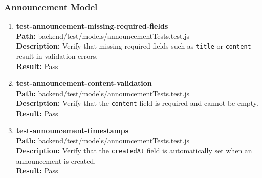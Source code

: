 \documentclass[12pt, titlepage]{article}
\begin{document}
\subsubsection{Announcement Model}
\begin{enumerate}
        \item{\textbf{test-announcement-missing-required-fields}\\}
        \textbf{Path:} backend/test/models/announcementTests.test.js\\
        \textbf{Description:} Verify that missing required fields such as \texttt{title} or \texttt{content} result in validation errors.\\
        \textbf{Result:} Pass

    \item{\textbf{test-announcement-content-validation}\\}
        \textbf{Path:} backend/test/models/announcementTests.test.js\\
        \textbf{Description:} Verify that the \texttt{content} field is required and cannot be empty.\\
        \textbf{Result:} Pass

    \item{\textbf{test-announcement-timestamps}\\}
        \textbf{Path:} backend/test/models/announcementTests.test.js\\
        \textbf{Description:} Verify that the \texttt{createdAt} field is automatically set when an announcement is created.\\
        \textbf{Result:} Pass
\end{enumerate}
\end{document}
